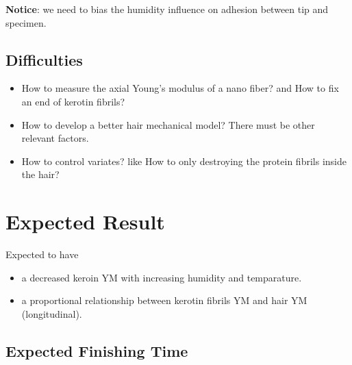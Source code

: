 \documentclass{article}
\begin{document}
\textbf{Notice}: we need to bias the humidity influence on adhesion between tip and specimen.

\subsection{Difficulties}
\begin{itemize}
    \item How to measure the axial Young's modulus of a nano fiber? and How to fix an end of kerotin fibrils?
    
    \item How to develop a better hair mechanical model? There must be other relevant factors.

	\item How to control variates? like How to only destroying the protein fibrils inside the hair?
\end{itemize}


\section{Expected Result}
Expected to have 
\begin{itemize}
	
	\item a decreased keroin YM with increasing humidity and temparature.
	 \item a proportional relationship between kerotin fibrils YM and hair YM (longitudinal). 
\end{itemize}
\subsection{Expected Finishing Time}



\end{document}
